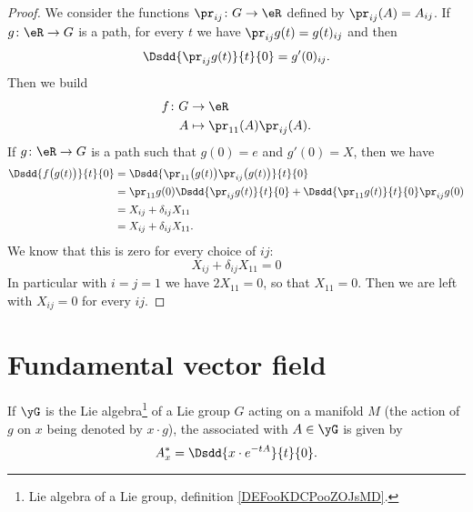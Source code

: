 \begin{proof}
    We consider the functions \( \pr_{ij}\colon G\to \eR\) defined by \( \pr_{ij}(A)=A_{ij}\). If \( g\colon \eR\to G\) is a path, for every \( t\) we have \( \pr_{ij}g(t)=g(t)_{ij}\) and then
    \begin{equation}
        \Dsdd{ \pr_{ij}g(t) }{t}{0}=g'(0)_{ij}.
    \end{equation}
    Then we build
    \begin{equation}
        \begin{aligned}
            f\colon G&\to \eR \\
            A&\mapsto \pr_{11}(A)\pr_{ij}(A). 
        \end{aligned}
    \end{equation}
    If \( g\colon \eR\to G\) is a path such that \( g(0)=e\) and \( g'(0)=X\), then we have
    \begin{subequations}
        \begin{align}
            \Dsdd{ f\big( g(t) \big) }{t}{0}&=\Dsdd{ \pr_{11}\big( g(t) \big)\pr_{ij}\big( g(t) \big) }{t}{0}\\
            &=\pr_{11}g(0)\Dsdd{ \pr_{ij}g(t) }{t}{0}+\Dsdd{ \pr_{11}g(t) }{t}{0}\pr_{ij}g(0)\\
            &=X_{ij}+\delta_{ij}X_{11}\\
            &=X_{ij}+\delta_{ij}X_{11}.
        \end{align}
    \end{subequations}
    We know that this is zero for every choice of \( ij\):
    \begin{equation}
        X_{ij}+\delta_{ij}X_{11}=0
    \end{equation}
    In particular with \( i=j=1\) we have \( 2X_{11}=0\), so that \( X_{11}=0\). Then we are left with \( X_{ij}=0\) for every \( ij\).
\end{proof}

\section{Fundamental vector field}\label{sec:fond_vec}

\begin{definition}
    If $\yG$ is the Lie algebra\footnote{Lie algebra of a Lie group, definition \ref{DEFooKDCPooZOJsMD}.} of a Lie group $G$ acting on a manifold $M$ (the action of $g$ on $x$ being denoted by $x\cdot g$), the  associated with $A\in\yG$ is given by
    \begin{equation}			\label{EqDefChmpFond}
       A^*_x=\Dsdd{ x\cdot e^{-tA} }{t}{0}.
    \end{equation}
\end{definition}

